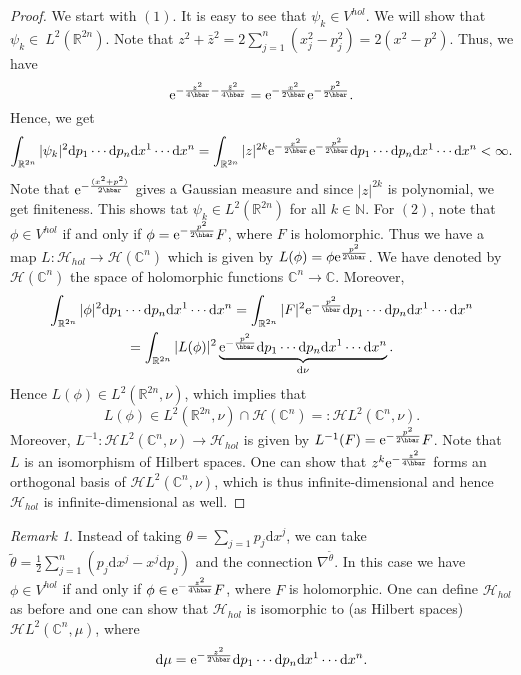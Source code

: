 \documentclass[12pt]{amsart}
\numberwithin{equation}{section}
\theoremstyle{plain}
\theoremstyle{definition}
\theoremstyle{remark}
\newtheorem{rem}{Remark}[subsection]
\newcommand{\R}{\mathbb{R}}
\newcommand{\N}{\mathbb{N}}
\newcommand{\dd}{{\mathrm{d}}}
\newcommand{\calH}{\mathcal{H}}
\newcommand{\ee}{\textnormal{e}}
\begin{document}
\begin{proof}
We start with $(1)$. It is easy to see that $\psi_k\in V^{hol}$. We will show that $\psi_k\in\ L^2(\R^{2n})$. Note that $z^2+\bar z^2=2\sum_{j=1}^n(x_j^2-p_j^2)=2(x^2-p^2)$. Thus, we have $$\ee^{-\frac{z^2}{4\hbar}-\frac{\bar z^2}{4\hbar}}=\ee^{-\frac{x^2}{2\hbar}}\ee^{-\frac{p^2}{2\hbar}}.$$ Hence, we get
$$\int_{\R^{2n}}\vert \psi_k\vert^2\dd p_1\dotsm\dd p_n\dd x^{1}\dotsm\dd x^n=\int_{\R^{2n}}\vert z\vert^{2k}\ee^{-\frac{x^2}{2\hbar}}\ee^{-\frac{p^2}{2\hbar}}\dd p_1\dotsm\dd p_n\dd x^{1}\dotsm\dd x^n<\infty.$$
Note that $\ee^{-\frac{(x^2+p^2)}{2\hbar}}$ gives a Gaussian measure and since $\vert z\vert^{2k}$ is polynomial, we get finiteness. This shows tat $\psi_k\in L^2(\R^{2n})$ for all $k\in\N$. For $(2)$, note that $\phi\in V^{hol}$ if and only if $\phi=\ee^{-\frac{p^2}{2\hbar}}F$, where $F$ is holomorphic. Thus we have a map $L\colon\calH_{hol}\to \mathscr{H}(\mathbb{C}^n)$ which is given by $L(\phi)=\phi\ee^{\frac{p^2}{2\hbar}}$. We have denoted by $\mathscr{H}(\mathbb C^n)$ the space of holomorphic functions $\mathbb C^n\to \mathbb C$. Moreover, 
\begin{multline*}
\int_{\R^{2n}}\vert\phi\vert^2\dd p_1\dotsm\dd p_n\dd x^{1}\dotsm\dd x^n=\int_{\R^{2n}}\vert F\vert^2\ee^{-\frac{p^2}{\hbar}}\dd p_1\dotsm\dd p_n\dd x^{1}\dotsm\dd x^n\\=\int_{\R^{2n}}\vert L(\phi)\vert^2\underbrace{\ee^{-\frac{p^2}{\hbar}}\dd p_1\dotsm\dd p_n\dd x^{1}\dotsm\dd x^n}_{\dd\nu}.
\end{multline*}
Hence $L(\phi)\in L^2(\R^{2n},\nu)$, which implies that 
\[
L(\phi)\in L^2(\R^{2n},\nu)\cap \mathscr{H}(\mathbb{C}^n)=:\mathscr{H}L^2(\mathbb{C}^n,\nu).
\]
Moreover, $L^{-1}\colon \mathscr{H}L^2(\mathbb{C}^n,\nu)\to \calH_{hol}$ is given by $L^{-1}(F)=\ee^{-\frac{p^2}{2\hbar}}F$. Note that $L$ is an isomorphism of Hilbert spaces. One can show that $z^k\ee^{-\frac{z^2}{4\hbar}}$ forms an orthogonal basis of $\mathscr{H}L^2(\mathbb{C}^n,\nu)$, which is thus infinite-dimensional and hence $\calH_{hol}$ is infinite-dimensional as well. 
\end{proof}

\begin{rem}
\label{rem_theta}
Instead of taking $\theta=\sum_{j=1}p_j\dd x^j$, we can take $\widetilde{\theta}=\frac{1}{2}\sum_{j=1}^n(p_j\dd x^j-x^j\dd p_j)$ and the connection $\nabla^{\widetilde{\theta}}$. In this case we have $\phi\in V^{hol}$ if and only if $\phi\in\ee^{-\frac{z^2}{4\hbar}}F$, where $F$ is holomorphic. One can define $\calH_{hol}$ as before and one can show that $\calH_{hol}$ is isomorphic to (as Hilbert spaces) $\mathscr{H}L^2(\mathbb{C}^n,\mu)$, where 
\[
\dd\mu=\ee^{-\frac{z^2}{2\hbar}}\dd p_1\dotsm \dd p_n\dd x^1\dotsm \dd x^n.
\]
\end{rem}
\end{document}
